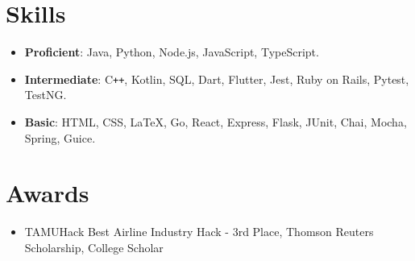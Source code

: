 \documentclass[letterpaper,11pt]{article}
\newcommand{\resumeItem}[1]{
  \item\small{
    #1 \vspace{-2pt}
  }
}
\newcommand{\resumeSubItem}[1]{\resumeItem{#1}\vspace{-4pt}}
\newcommand{\resumeSubHeadingListStart}{\begin{itemize}[leftmargin=*]}
\newcommand{\resumeSubHeadingListEnd}{\end{itemize}}
\begin{document}
\section{Skills}
  \resumeSubHeadingListStart
    \resumeSubItem
      {\textbf{Proficient}: Java, Python, Node.js, JavaScript, TypeScript.}
    \resumeSubItem
      {\textbf{Intermediate}: C\texttt{++}, Kotlin, SQL, Dart, Flutter, Jest, Ruby on Rails, Pytest, TestNG.}
    \resumeSubItem
      {\textbf{Basic}: HTML, CSS, \LaTeX, Go, React, Express, Flask, JUnit, Chai, Mocha, Spring, Guice.}
  \resumeSubHeadingListEnd

\section{Awards}
  \resumeSubHeadingListStart
    \resumeSubItem
      {TAMUHack Best Airline Industry Hack - 3rd Place, Thomson Reuters Scholarship, College Scholar}
  \resumeSubHeadingListEnd

\end{document}
